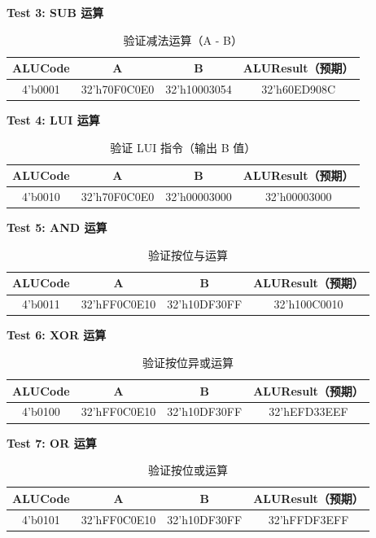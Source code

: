 \documentclass[12pt,a4paper]{article}
\begin{document}
\textbf{Test 3: SUB 运算}

\begin{table}[H]
\centering
\begin{tabular}{|c|c|c|c|}
\hline
ALUCode & A & B & ALUResult（预期） \\ \hline
4'b0001 & 32'h70F0C0E0 & 32'h10003054 & 32'h60ED908C \\ \hline
\end{tabular}
\caption{验证减法运算（A - B）}
\end{table}

\textbf{Test 4: LUI 运算}

\begin{table}[H]
\centering
\begin{tabular}{|c|c|c|c|}
\hline
ALUCode & A & B & ALUResult（预期） \\ \hline
4'b0010 & 32'h70F0C0E0 & 32'h00003000 & 32'h00003000 \\ \hline
\end{tabular}
\caption{验证 LUI 指令（输出 B 值）}
\end{table}

\textbf{Test 5: AND 运算}

\begin{table}[H]
\centering
\begin{tabular}{|c|c|c|c|}
\hline
ALUCode & A & B & ALUResult（预期） \\ \hline
4'b0011 & 32'hFF0C0E10 & 32'h10DF30FF & 32'h100C0010 \\ \hline
\end{tabular}
\caption{验证按位与运算}
\end{table}

\textbf{Test 6: XOR 运算}

\begin{table}[H]
\centering
\begin{tabular}{|c|c|c|c|}
\hline
ALUCode & A & B & ALUResult（预期） \\ \hline
4'b0100 & 32'hFF0C0E10 & 32'h10DF30FF & 32'hEFD33EEF \\ \hline
\end{tabular}
\caption{验证按位异或运算}
\end{table}

\textbf{Test 7: OR 运算}

\begin{table}[H]
\centering
\begin{tabular}{|c|c|c|c|}
\hline
ALUCode & A & B & ALUResult（预期） \\ \hline
4'b0101 & 32'hFF0C0E10 & 32'h10DF30FF & 32'hFFDF3EFF \\ \hline
\end{tabular}
\caption{验证按位或运算}
\end{table}
\end{document}
